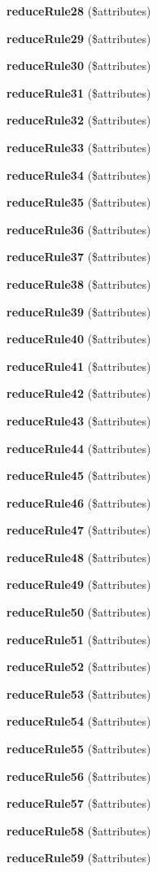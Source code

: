 \begin{DoxyCompactItemize}
{\bf reduce\+Rule28} (\$attributes)
\item 
{\bf reduce\+Rule29} (\$attributes)
\item 
{\bf reduce\+Rule30} (\$attributes)
\item 
{\bf reduce\+Rule31} (\$attributes)
\item 
{\bf reduce\+Rule32} (\$attributes)
\item 
{\bf reduce\+Rule33} (\$attributes)
\item 
{\bf reduce\+Rule34} (\$attributes)
\item 
{\bf reduce\+Rule35} (\$attributes)
\item 
{\bf reduce\+Rule36} (\$attributes)
\item 
{\bf reduce\+Rule37} (\$attributes)
\item 
{\bf reduce\+Rule38} (\$attributes)
\item 
{\bf reduce\+Rule39} (\$attributes)
\item 
{\bf reduce\+Rule40} (\$attributes)
\item 
{\bf reduce\+Rule41} (\$attributes)
\item 
{\bf reduce\+Rule42} (\$attributes)
\item 
{\bf reduce\+Rule43} (\$attributes)
\item 
{\bf reduce\+Rule44} (\$attributes)
\item 
{\bf reduce\+Rule45} (\$attributes)
\item 
{\bf reduce\+Rule46} (\$attributes)
\item 
{\bf reduce\+Rule47} (\$attributes)
\item 
{\bf reduce\+Rule48} (\$attributes)
\item 
{\bf reduce\+Rule49} (\$attributes)
\item 
{\bf reduce\+Rule50} (\$attributes)
\item 
{\bf reduce\+Rule51} (\$attributes)
\item 
{\bf reduce\+Rule52} (\$attributes)
\item 
{\bf reduce\+Rule53} (\$attributes)
\item 
{\bf reduce\+Rule54} (\$attributes)
\item 
{\bf reduce\+Rule55} (\$attributes)
\item 
{\bf reduce\+Rule56} (\$attributes)
\item 
{\bf reduce\+Rule57} (\$attributes)
\item 
{\bf reduce\+Rule58} (\$attributes)
\item 
{\bf reduce\+Rule59} (\$attributes)

\end{DoxyCompactItemize}
